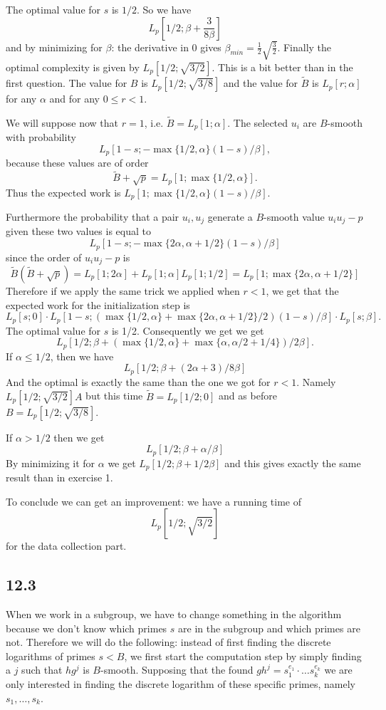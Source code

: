 \documentclass[12pt,a4paper]{article}
\newcommand {\Lfunc}[2]{L_p[#1;#2]}
\begin{document}
The optimal value for $s$ is $1/2$. So we have
\[
    \Lfunc{1/2}{\beta + \frac{3}{8\beta}}
\]
and by minimizing for $\beta$: the derivative in 0 gives $\beta_{min} = \frac{1}{2}\sqrt{\frac{3}{2}}$.
Finally the optimal complexity is given by $\Lfunc{1/2}{\sqrt{3/2}}$. This is a bit better than in the first question.
The value for $B$ is $\Lfunc{1/2}{\sqrt{3/8}}$ and the value for $\tilde{B}$ is $\Lfunc{r}{\alpha}$ for any $\alpha$ and for any $0 \leq r < 1$. 

We will suppose now that $r = 1$, i.e. $\tilde{B} = \Lfunc{1}{\alpha}$.
The selected $u_i$ are $B$-smooth with probability
\[
    \Lfunc{1-s}{-\max\{1/2,\alpha\}(1-s)/\beta},
\]
because these values are of order 
\[
    \tilde{B} + \sqrt{p} = \Lfunc{1}{\max\{1/2,\alpha\}}.
\]
Thus the expected work is $\Lfunc{1}{\max\{1/2,\alpha\}(1-s)/\beta}$.

Furthermore the probability that a pair $u_i,u_j$ generate a $B$-smooth value $u_iu_j - p$ given these two values is equal to
\[
    \Lfunc{1-s}{-\max\{2\alpha,\alpha+1/2\}(1-s)/\beta}
\]
since the order of $u_iu_j - p$ is
\[
    \tilde{B}(\tilde{B} + \sqrt{p}) = \Lfunc{1}{2\alpha} + \Lfunc{1}{\alpha}\Lfunc{1}{1/2} = \Lfunc{1}{\max\{2\alpha,\alpha + 1/2 \}}
\]
Therefore if we apply the same trick we applied when $r < 1$, we get that the expected work for the initialization step is
\[
    \Lfunc{s}{0}\cdot\Lfunc{1-s}{(\max\{1/2,\alpha\}+\max\{2\alpha,\alpha+1/2\}/2)(1-s)/\beta}\cdot\Lfunc{s}{\beta}.
\]
The optimal value for $s$ is 1/2. Consequently we get we get
\[
    \Lfunc{1/2}{\beta + (\max\{1/2,\alpha\}+\max\{\alpha,\alpha/2+1/4\})/2\beta} .%
\]
If $\alpha \leq 1/2$, then we have
\[
    \Lfunc{1/2}{\beta + (2\alpha + 3)/8\beta}
\]
And the optimal is exactly the same than the one we got for $r<1$. Namely $\Lfunc{1/2}{\sqrt{3/2}}A$ but this time
$\tilde{B} = \Lfunc{1/2}{0}$ and as before $B = \Lfunc{1/2}{\sqrt{3/8}}$.

If $\alpha > 1/2$ then we get
\[
    \Lfunc{1/2}{\beta + \alpha/\beta}
\]
By minimizing it for $\alpha$ we get $\Lfunc{1/2}{\beta + 1/2\beta}$ and this gives exactly the same result than in exercise 1.

To conclude we can get an improvement: we have a running time of 
\[
    \Lfunc{1/2}{\sqrt{3/2}}
\]
for the data collection part.



\subsection{12.3}
When we work in a subgroup, we have to change something in the algorithm because we don't know which primes $s$ are in the subgroup and which primes are not.
Therefore we will do the following: instead of first finding the discrete logarithms of primes $s < B$, we first start the computation step 
by simply finding a $j$ such that $hg^j$ is $B$-smooth. Supposing that the found $gh^j = s_1^{e_1} \cdot \dots s_k^{e_k}$ we are only interested in
finding the discrete logarithm of these specific primes, namely $s_1,\dots,s_k$.
\end{document}
